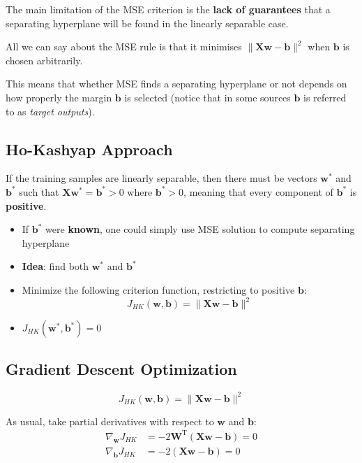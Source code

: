 \documentclass[11pt,a4paper]{article}
\theoremstyle{definition}
\theoremstyle{plain}
\theoremstyle{remark}
\begin{document}
\begin{tcolorbox}[colback=red!10!white,colframe=red!75!black,title=\textbf{MSE Limitation}]
The main limitation of the MSE criterion is the \textbf{lack of guarantees} that a separating hyperplane will be found in the linearly separable case.
\end{tcolorbox}

All we can say about the MSE rule is that it minimises $\|\mathbf{X}\mathbf{w} - \mathbf{b}\|^2$ when $\mathbf{b}$ is chosen arbitrarily.

This means that whether MSE finds a separating hyperplane or not depends on how properly the margin $\mathbf{b}$ is selected (notice that in some sources $\mathbf{b}$ is referred to as \textit{target outputs}).

\subsection{Ho-Kashyap Approach}

If the training samples are linearly separable, then there must be vectors $\mathbf{w}^*$ and $\mathbf{b}^*$ such that $\mathbf{X}\mathbf{w}^* = \mathbf{b}^* > 0$ where $\mathbf{b}^* > 0$, meaning that every component of $\mathbf{b}^*$ is \textbf{positive}.

\begin{itemize}
    \item If $\mathbf{b}^*$ were \textbf{known}, one could simply use MSE solution to compute separating hyperplane
    
    \item \textbf{Idea}: find both $\mathbf{w}^*$ and $\mathbf{b}^*$
    
    \item Minimize the following criterion function, restricting to positive $\mathbf{b}$:
    \[
    J_{HK}(\mathbf{w}, \mathbf{b}) = \|\mathbf{X}\mathbf{w} - \mathbf{b}\|^2
    \]
    
    \item $J_{HK}(\mathbf{w}^*, \mathbf{b}^*) = 0$
\end{itemize}

\subsection{Gradient Descent Optimization}

\[
J_{HK}(\mathbf{w}, \mathbf{b}) = \|\mathbf{X}\mathbf{w} - \mathbf{b}\|^2
\]

As usual, take partial derivatives with respect to $\mathbf{w}$ and $\mathbf{b}$:
\begin{align*}
\nabla_{\mathbf{w}} J_{HK} &= -2 \mathbf{W}^{\mathrm{T}} (\mathbf{X}\mathbf{w} - \mathbf{b}) = 0 \\
\nabla_{\mathbf{b}} J_{HK} &= -2 (\mathbf{X}\mathbf{w} - \mathbf{b}) = 0
\end{align*}
\end{document}
